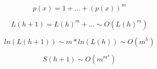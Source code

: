 \documentclass{article}
\begin{document}
$$ p(x) = 1 +\dots + (p(x))^m$$

$$ L(h+1) = L(h)^m + \dots \sim O(L(h)^m) $$

$$ ln (L(h+1)) \sim m * ln(L(h)) \sim O(m^h)$$
  
$$S(h+1)\sim O(m^{m^h}) $$
\begin{comment}


\section{Попробую в общем виде}
Рассматриваем fully abstract типы с рекурсией. Конструкторы -- $C_1\dots C_n$. Количество рекурсивных аргументов в i-м конструкторе -- $a_i$, рекурсивных аргументов во всех конструкторах -- $\sum_{i=1}^{n} a_i$. Таким образом нерекурсивных аргументов как бы нет и новых жителей они не дают. Все типы записываются как полином
\[
t(x) = c_0 + c_1*t(x) + \dots + c_n*t^n(x) + ...
\]
Здесь степени -- это количество рекурсивных аргументов конструктора


$L(h) = \begin{cases}
O(1) & h=1\\
\sum{a_i} * S(h-1),&h>1
\end{cases} = O(c^h)$

Наибольшее влияние оказывает наибольшая степень (где больше всего рекурсивных аргументов)

$S(h) = \sum_{i=1}^{h} L(i)  = O(c^h)$


\section{Про количество примеров}

$L(h)$ -- количество жителей высоты $h\ge 1$

$S(h)$ -- количество жителей высоты от 1 до $h$

Очевидно, что на $L(h)$ больше влияет количество конструкторов, а на $S(h)$ -- на сколько сильно они ветвятся

Пару примеров
\begin{itemize}
\item Числа Пеано: $p(x) = 1 + p(x)$\\ $L(h) = 1$, $S(h) = h$

\item Числа Пеано с двумя видами листов: $p(x) = 2 + p(x)$\\
$L(h) = 2$, $S(h) = 2*h$
\item Деревья: $t(x) = 1 + t^2(x)$\\
$L(h) = \begin{cases}
1, & h=1\\
1, & h=2\\
3, & h=3\\
2*L(h-1),&h>1
\end{cases} = 2^{h-1}$

$S(h) = \sum_{i=1}^{h} L(i) =\sum_{i=1}^{h} 2^{i-1} =2^h - 1$

\item Деревья с двумя видами листов: $t(x) = 2 + t^2(x)$\\
$L(h) = 2^h$\\

$S(h) = \sum_{i=1}^{h} L(i) =\sum_{i=1}^{h} 2^{i} =2(2^h - 1)$

\end{itemize}

\end{comment}
\end{document}
